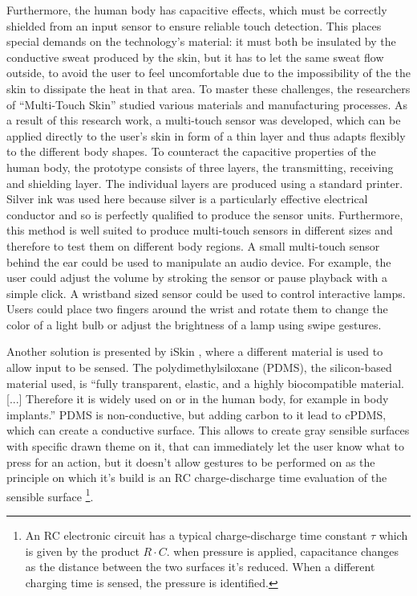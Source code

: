 \documentclass{sigchi}
\begin{document}
Furthermore, the human body has capacitive effects, which must be correctly shielded from an input sensor to ensure reliable touch detection. This places special demands on the technology's material: it must both be insulated by the conductive sweat produced by the skin, but it has to let the same sweat flow outside, to avoid the user to feel uncomfortable due to the impossibility of the the skin to dissipate the heat in that area. \cite{ulbrich2} %
To master these challenges, the researchers of “Multi-Touch Skin” \cite{ulbrich2} studied various materials and manufacturing processes. As a result of this research work, a multi-touch sensor was developed, which can be applied directly to the user's skin in form of a thin layer and thus adapts flexibly to the different body shapes. To counteract the capacitive properties of the human body, the prototype consists of three layers, the transmitting, receiving and shielding layer. The individual layers are produced using a standard printer. Silver ink was used here because silver is a particularly effective electrical conductor and so is perfectly qualified to produce the sensor units. Furthermore, this method is well suited to produce multi-touch sensors in different sizes and therefore to test them on different body regions. \cite{ulbrich2}
A small multi-touch sensor behind the ear could be used to manipulate an audio device. For example, the user could adjust the volume by stroking the sensor or pause playback with a simple click. A wristband sized sensor could be used to control interactive lamps. Users could place two fingers around the wrist and rotate them to change the color of a light bulb or adjust the brightness of a lamp using swipe gestures. \cite{ulbrich2}

Another solution is presented by iSkin \cite{iSkin}, where a different material is used to allow input to be sensed. The polydimethylsiloxane (PDMS), the silicon-based material used, is “fully transparent, elastic, and a highly biocompatible material. [...] Therefore it is widely used on or in the human body, for example in body implants.” \cite[p. 2994]{iSkin} PDMS is non-conductive, but adding carbon to it lead to cPDMS, which can create a conductive surface. This allows to create gray sensible surfaces with specific drawn theme on it, that can immediately let the user know what to press for an action, but it doesn’t allow gestures to be performed on as the principle on which it’s build is an RC charge-discharge time evaluation of the sensible surface \footnote{An RC electronic circuit has a typical charge-discharge time constant $\tau$ which is given by the product $R \cdot C$. when pressure is applied, capacitance changes as the distance between the two surfaces it’s reduced. When a different charging time is sensed, the pressure is identified.}.
\end{document}
